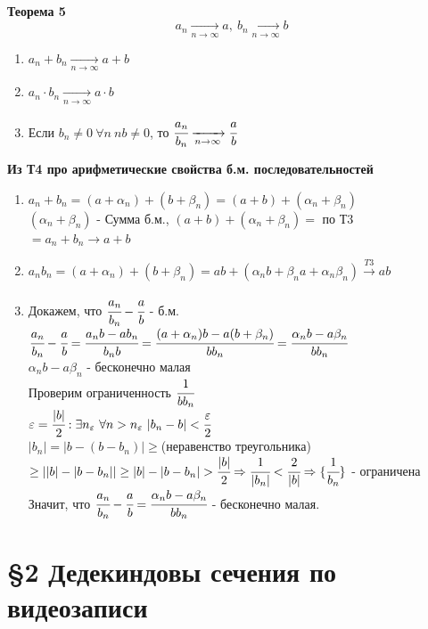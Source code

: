 \documentclass[12pt, a4paper]{article}
\newcommand{\eps}{\varepsilon}
\begin{document}
\begin{tcolorbox}
\textbf{Теорема 5}
\[ a_n \xrightarrow[n\rightarrow \infty]{}a,\ b_n \xrightarrow[n\rightarrow \infty]{}b\]
\begin{enumerate}
    \item $a_n + b_n \xrightarrow[n\rightarrow \infty]{} a + b$
    \item $a_n \cdot b_n \xrightarrow[n\rightarrow \infty]{} a \cdot b$
    \item Если $b_n \ne 0\ \forall n \ nb \ne 0$, то $\cfrac{a_n}{b_n} \xrightarrow[n\rightarrow \infty]{} \cfrac{a}{b}$
\end{enumerate}
\end{tcolorbox}

\begin{tcolorbox}[title=Доказательство Т5: Арифметические свойства предела, breakable]
\textbf{Из Т4 про арифметические свойства б.м. последовательностей}
\begin{enumerate}
    \item $a_n + b_n = (a + \alpha_n) + (b+\beta_n) = (a+b)+(\alpha_n+\beta_n)$\\
    $(\alpha_n+\beta_n)$ - Сумма б.м., $(a+b)+(\alpha_n+\beta_n) = $ по Т3 $= a_n+b_n \rightarrow a + b$
    \item $a_nb_n = (a + \alpha_n) + (b + \beta_n) = ab + (\alpha_nb + \beta_na + \alpha_n\beta_n) \xrightarrow[]{T3} ab$
    \item Докажем, что $\cfrac{a_n}{b_n} - \cfrac{a}{b}$ - б.м.\\
    $\cfrac{a_n}{b_n} - \cfrac{a}{b} = \cfrac{a_nb-ab_n}{b_nb} = \cfrac{(a+\alpha_n)b-a(b+\beta_n)}{bb_n} = \cfrac{\alpha_nb-a\beta_n}{bb_n}$\\
    $\alpha_nb-a\beta_n$ - бесконечно малая\\
    Проверим ограниченность $\cfrac{1}{bb_n}$\\
    $\eps=\cfrac{|b|}{2}: \exists n_\eps\ \forall n>n_\eps\ |b_n-b|<\cfrac{\eps}{2}$\\
    $|b_n| = |b-(b-b_n)| \geq{}$(неравенство треугольника)$\geq ||b|-|b-b_n||\geq|b|-|b-b_n|>\cfrac{|b|}{2}\Rightarrow\cfrac{1}{|b_n|}<\cfrac{2}{|b|} \Rightarrow \{\cfrac{1}{b_n}\}$ - ограничена\\
    Значит, что $\cfrac{a_n}{b_n} - \cfrac{a}{b} = \cfrac{\alpha_nb-a\beta_n}{bb_n}$ - бесконечно малая.
\end{enumerate}
\end{tcolorbox}

\newpage
\section*{\S 2 Дедекиндовы сечения по видеозаписи}
\end{document}
